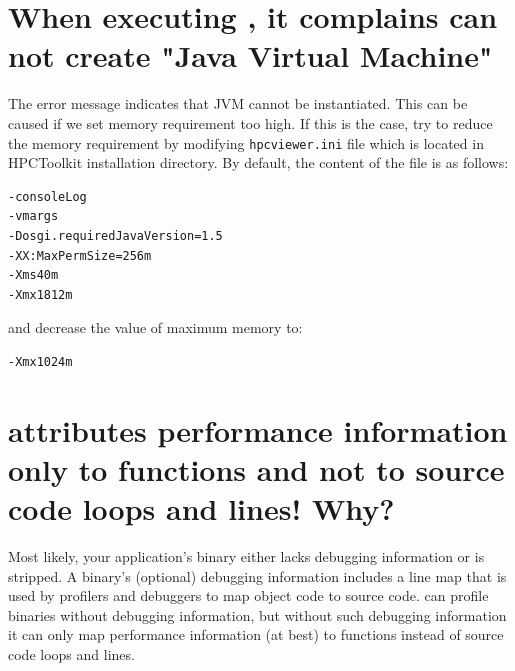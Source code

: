 \documentclass[11pt,letterpaper]{report}
\begin{document}
\section{When executing \hpcviewer, it complains can not create "Java Virtual Machine"}
The error message indicates that JVM cannot be instantiated. This can be caused if we set memory requirement too high.
If this is the case, try to reduce the memory requirement by modifying \texttt{hpcviewer.ini} file which is located in HPCToolkit installation directory.
By default, the content of the file is as follows:
\begin{verbatim}
-consoleLog
-vmargs
-Dosgi.requiredJavaVersion=1.5
-XX:MaxPermSize=256m
-Xms40m
-Xmx1812m
\end{verbatim}
 and decrease the value of maximum memory to:
\begin{verbatim}
-Xmx1024m
\end{verbatim}




\section{\hpcviewer{} attributes performance information only to functions and not to source code loops and lines! Why?}
\label{sec:troubleshooting:debug-info}

Most likely, your application's binary either lacks debugging information or is stripped.
A binary's (optional) debugging information includes a line map that is used by profilers and debuggers to map object code to source code.
\HPCToolkit{} can profile binaries without debugging information, but without such debugging information it can only map performance information (at best) to functions instead of source code loops and lines.
\end{document}
